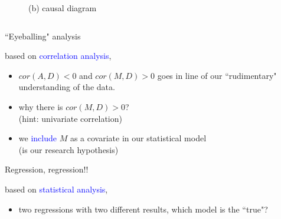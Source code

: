 \begin{frame}
\begin{columns}
\begin{column}{0.5\textwidth}
\begin{figure}
				\caption*{(b) causal diagram}
			\end{figure}
		\end{column}
	\end{columns}
\end{frame}
%
%
\begin{lhframe}[rhgraphic={\texttt{[image: fork1\_panel.pdf]}}]
	{``Eyeballing" analysis}
	
	based on \textcolor{blue}{correlation analysis},
	\begin{itemize}
		\item $cor(A, D)<0$ and $cor(M, D)>0$ goes in line of our ``rudimentary" understanding of the data.
		\item why there is $cor(M, D)>0$? \\
		{\small (hint: univariate correlation)}
		\item we \textcolor{blue}{include} $M$ as a covariate in our statistical model \\
		{\small (is our research hypothesis)}
	\end{itemize}
\end{lhframe}
%
%
\begin{lhframe}[rhgraphic={\texttt{[image: fork1\_reg.png]}}]
	{Regression, regression!!}
	
	based on \textcolor{blue}{statistical analysis},
	\begin{itemize}
		\item two regressions with two different results, which model is the ``true"?
	\end{itemize}
\end{lhframe}
%
%
